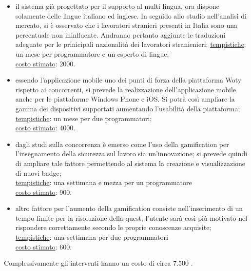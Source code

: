 \begin{itemize}
\item il sistema già progettato per il supporto al multi lingua, ora dispone solamente delle lingue italiano ed inglese. In seguido allo studio nell'analisi di mercato, si è osservato che i lavoratori stranieri presenti in Italia sono una percentuale non ininfluente. Andranno pertanto aggiunte le traduzioni adeguate per le prinicipali nazionalità dei lavoratori stranienieri;
\underline{tempistiche}: un mese per programmatore e un esperto di lingue;\\
\underline{costo stimato}: 2000\EUR.


\item essendo l'applicazione mobile uno dei punti di forza della piattaforma Woty rispetto ai concorrenti, si prevede la realizzazione dell'applicazione mobile anche per le piattaforme Windows Phone e iOS.
Si potrà così ampliare la gamma dei dispositivi supportati aumentando l'usabilità della piattaforma;\\
\underline{tempistiche}: un mese per due programmatori;\\
\underline{costo stimato}: 4000\EUR.


\item dagli studi sulla concorrenza è emerso come l'uso della gamification per l'insegnamento della sicurezza sul lavoro sia un'innovazione; si prevede quindi di ampliare tale fattore permettendo al sistema la creazione e visualizzazione di nuovi badge;\\
\underline{tempistiche}: una settimana e mezza per un programmatore\\
\underline{costo stimato}: 900\EUR.


\item altro fattore per l'aumento della gamification consiste nell’inserimento di un tempo limite per la risoluzione della quest, l'utente sarà così più motivato nel rispondere correttamente secondo le proprie conoscenze acquisite;\\
\underline{tempistiche}: una settimana per due programmatori\\
\underline{costo stimato}: 600\EUR.

\end{itemize}


Complessivamente gli interventi hanno un costo di circa 7.500 \EUR.






